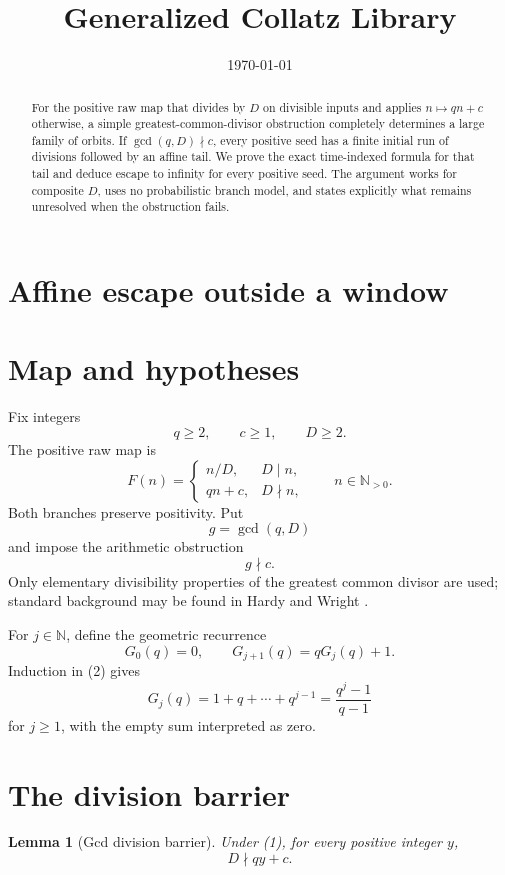 \documentclass[11pt,letterpaper]{article}
\title{Generalized Collatz Library}
\author{}
\date{\today}
\newcommand{\N}{\mathbb{N}}
\newtheorem{lemma}[theorem]{Lemma}
\begin{document}
\maketitle
\section*{Affine escape outside a window}

\begin{abstract}
For the positive raw map that divides by \(D\) on divisible inputs and applies
\(n\mapsto qn+c\) otherwise, a simple greatest-common-divisor obstruction
completely determines a large family of orbits. If
\(\gcd(q,D)\nmid c\), every positive seed has a finite initial run of divisions
followed by an affine tail. We prove the exact time-indexed formula for that
tail and deduce escape to infinity for every positive seed. The argument works
for composite \(D\), uses no probabilistic branch model, and states explicitly
what remains unresolved when the obstruction fails.
\end{abstract}

\section{Map and hypotheses}

Fix integers
\[
q\ge2,\qquad c\ge1,\qquad D\ge2.
\]
The positive raw map is
\[
F(n)=
\begin{cases}
n/D,&D\mid n,\\
qn+c,&D\nmid n,
\end{cases}
\qquad n\in\N_{>0}.
\]
Both branches preserve positivity. Put
\[
g=\gcd(q,D)
\]
and impose the arithmetic obstruction
\[
g\nmid c.                                                    \tag{1}
\]
Only elementary divisibility properties of the greatest common divisor are
used; standard background may be found in Hardy and Wright
\cite{HardyWright08}.

For \(j\in\N\), define the geometric recurrence
\[
G_0(q)=0,
\qquad
G_{j+1}(q)=qG_j(q)+1.                                         \tag{2}
\]
Induction in (2) gives
\[
G_j(q)=1+q+\cdots+q^{j-1}=\frac{q^j-1}{q-1}                  \tag{3}
\]
for \(j\ge1\), with the empty sum interpreted as zero.

\section{The division barrier}

\begin{lemma}[Gcd division barrier]
\label{lem:barrier}
Under (1), for every positive integer \(y\),
\[
D\nmid qy+c.
\]
\end{lemma}
\end{document}
